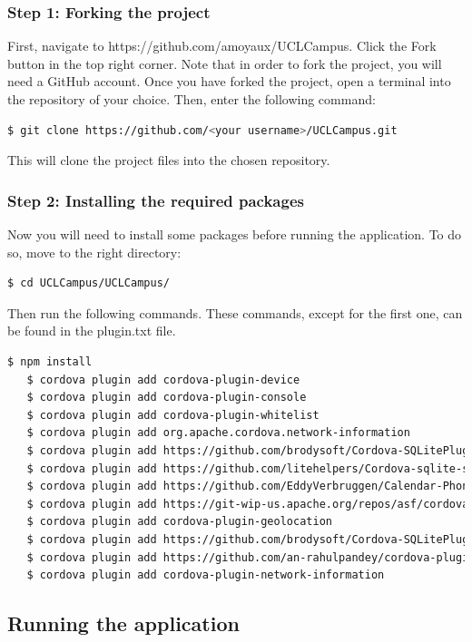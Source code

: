 \documentclass[11pt, a4paper]{report}
\begin{document}
\subsubsection{Step 1: Forking the project}
First, navigate to https://github.com/amoyaux/UCLCampus. Click the Fork button in the top right corner. Note that in order to fork the project, you will need a GitHub account.
Once you have forked the project, open a terminal into the repository of your choice. Then, enter the following command:
\begin{lstlisting}[language=bash]
   $ git clone https://github.com/<your username>/UCLCampus.git
\end{lstlisting}

This will clone the project files into the chosen repository.

\subsubsection{Step 2: Installing the required packages}

Now you will need to install some packages before running the application. To do so, move to the right directory:

\begin{lstlisting}[language=bash]
   $ cd UCLCampus/UCLCampus/
\end{lstlisting}
Then run the following commands. These commands, except for the first one, can be found in the plugin.txt file.
\begin{lstlisting}[language=bash]
   $ npm install
   $ cordova plugin add cordova-plugin-device
   $ cordova plugin add cordova-plugin-console
   $ cordova plugin add cordova-plugin-whitelist
   $ cordova plugin add org.apache.cordova.network-information
   $ cordova plugin add https://github.com/brodysoft/Cordova-SQLitePlugin.git
   $ cordova plugin add https://github.com/litehelpers/Cordova-sqlite-storage.git
   $ cordova plugin add https://github.com/EddyVerbruggen/Calendar-PhoneGap-Plugin.git
   $ cordova plugin add https://git-wip-us.apache.org/repos/asf/cordova-plugin-inappbrowser.git
   $ cordova plugin add cordova-plugin-geolocation
   $ cordova plugin add https://github.com/brodysoft/Cordova-SQLitePlugin.git
   $ cordova plugin add https://github.com/an-rahulpandey/cordova-plugin-dbcopy.git
   $ cordova plugin add cordova-plugin-network-information
\end{lstlisting}

\subsection{Running the application}
\end{document}
